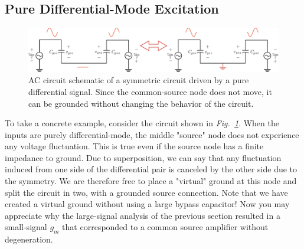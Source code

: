 \subsection{Pure Differential-Mode Excitation}
\begin{figure}[tb]
\centering
\includegraphics[width=\columnwidth]{DM_model.pdf}
\caption{AC circuit schematic of a symmetric circuit driven by a pure differential signal.  Since the common-source node does not move, it can be grounded without changing the behavior of the circuit.} \label{fig:DM_model.pdf}
\end{figure}
To take a concrete example, consider the circuit shown in \emph{Fig.~\ref{fig:DM_model.pdf}}. When the inputs are purely differential-mode, the middle "source" node does not experience any voltage fluctuation.  This is true even if the source node has a finite impedance to ground.  Due to superposition, we can say that any fluctuation induced from one side of the differential pair is canceled by the other side due to the symmetry. We are therefore free to place a "virtual" ground at this node and split the circuit in two, with a grounded source connection.  Note that we have created a virtual ground without using a large bypass capacitor!  Now you may appreciate why the large-signal analysis of the previous section resulted in a small-signal $g_m$ that corresponded to a common source amplifier without degeneration. 
